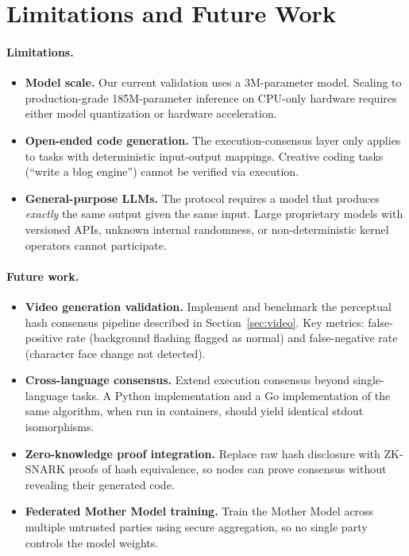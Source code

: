 \documentclass[11pt,a4paper]{article}
\begin{document}
\section{Limitations and Future Work}
\label{sec:discussion}

\paragraph{Limitations.}

\begin{itemize}
    \item \textbf{Model scale.} Our current validation uses a 3M-parameter
          model. Scaling to production-grade 185M-parameter inference
          on CPU-only hardware requires either model quantization or
          hardware acceleration.
    \item \textbf{Open-ended code generation.} The execution-consensus
          layer only applies to tasks with deterministic input-output
          mappings. Creative coding tasks (``write a blog engine'')
          cannot be verified via execution.
    \item \textbf{General-purpose LLMs.} The protocol requires a
          model that produces \emph{exactly} the same output given the
          same input. Large proprietary models with versioned APIs,
          unknown internal randomness, or non-deterministic kernel
          operators cannot participate.
\end{itemize}

\paragraph{Future work.}

\begin{itemize}
    \item \textbf{Video generation validation.} Implement and benchmark
          the perceptual hash consensus pipeline described in
          Section~\ref{sec:video}. Key metrics: false-positive rate
          (background flashing flagged as normal) and false-negative
          rate (character face change not detected).
    \item \textbf{Cross-language consensus.} Extend execution consensus
          beyond single-language tasks. A Python implementation and a
          Go implementation of the same algorithm, when run in
          containers, should yield identical stdout isomorphisms.
    \item \textbf{Zero-knowledge proof integration.} Replace raw hash
          disclosure with ZK-SNARK proofs of hash equivalence, so nodes
          can prove consensus without revealing their generated code.
    \item \textbf{Federated Mother Model training.} Train the Mother
          Model across multiple untrusted parties using secure
          aggregation, so no single party controls the model weights.
\end{itemize}
\end{document}
